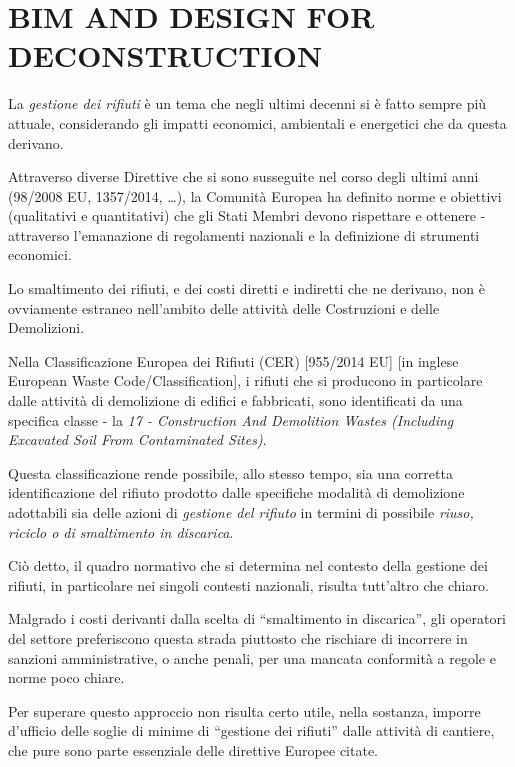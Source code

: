 \section{\uppercase{BIM and Design for Deconstruction}}
\label{sec:introduction}


La  \textit{gestione dei rifiuti} \`e un tema che negli ultimi decenni si \`e fatto sempre pi\`u  attuale, considerando gli impatti economici, ambientali e energetici che da questa derivano.
 
Attraverso diverse Direttive che si sono susseguite nel corso degli ultimi anni (98/2008 EU, 1357/2014, …), la Comunit\`a Europea ha definito norme e obiettivi (qualitativi e quantitativi) che gli Stati Membri devono rispettare e ottenere - attraverso l’emanazione di regolamenti nazionali e la definizione di strumenti economici.
 
Lo smaltimento dei rifiuti, e dei costi diretti e indiretti che ne derivano, non \`e ovviamente estraneo nell’ambito delle attività delle Costruzioni e delle Demolizioni.
  
Nella Classificazione Europea dei Rifiuti (CER) [955/2014 EU] [in inglese European Waste Code/Classification], i rifiuti che si producono in particolare dalle attivit\`a di demolizione di edifici e fabbricati, sono identificati da una specifica classe - la \textit{17 - Construction And Demolition Wastes (Including Excavated Soil From Contaminated Sites)}.
 
Questa classificazione rende possibile, allo stesso tempo, sia una corretta identificazione del rifiuto prodotto dalle specifiche modalità di demolizione adottabili sia delle azioni di \textit{gestione del rifiuto} in termini di possibile \textit{riuso, riciclo o di smaltimento in discarica}.

Ci\`o detto, il quadro normativo che si determina nel contesto della gestione dei rifiuti, in particolare nei singoli contesti nazionali, risulta tutt’altro che chiaro.

Malgrado i costi derivanti dalla scelta di “smaltimento in discarica”, gli operatori del settore preferiscono questa strada piuttosto che rischiare di incorrere in sanzioni amministrative, o anche penali, per una mancata conformit\`a a regole e norme poco chiare.
 
Per superare questo approccio non risulta certo utile, nella sostanza, imporre d’ufficio delle soglie di minime di “gestione dei rifiuti” dalle attività di cantiere,  che pure sono parte essenziale delle direttive Europee citate.

